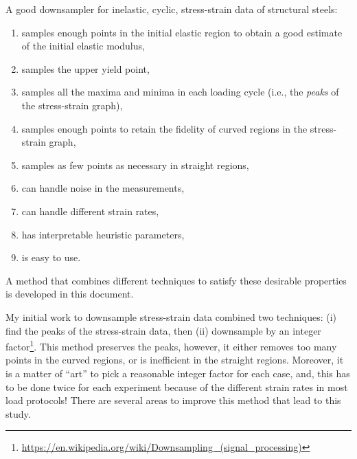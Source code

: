 \documentclass[a4paper,11pt]{article}
\begin{document}
A good downsampler for inelastic, cyclic, stress-strain data of structural steels:
\begin{enumerate}
    \item samples enough points in the initial elastic region to obtain a good estimate of the initial elastic modulus,
    \item samples the upper yield point,
    \item samples all the maxima and minima in each loading cycle (i.e., the \emph{peaks} of the stress-strain graph),
    \item samples enough points to retain the fidelity of curved regions in the stress-strain graph,
    \item samples as few points as necessary in straight regions,
    \item can handle noise in the measurements,
    \item can handle different strain rates,
    \item has interpretable heuristic parameters,
    \item is easy to use.
\end{enumerate}
A method that combines different techniques to satisfy these desirable properties is developed in this document.

My initial work to downsample stress-strain data combined two techniques: (i) find the peaks of the stress-strain data, then (ii) downsample by an integer factor\footnote{\url{https://en.wikipedia.org/wiki/Downsampling_(signal_processing)}}.
This method preserves the peaks, however, it either removes too many points in the curved regions, or is inefficient in the straight regions.
Moreover, it is a matter of ``art'' to pick a reasonable integer factor for each case, and, this has to be done twice for each experiment because of the different strain rates in most load protocols!
There are several areas to improve this method that lead to this study.
\end{document}
